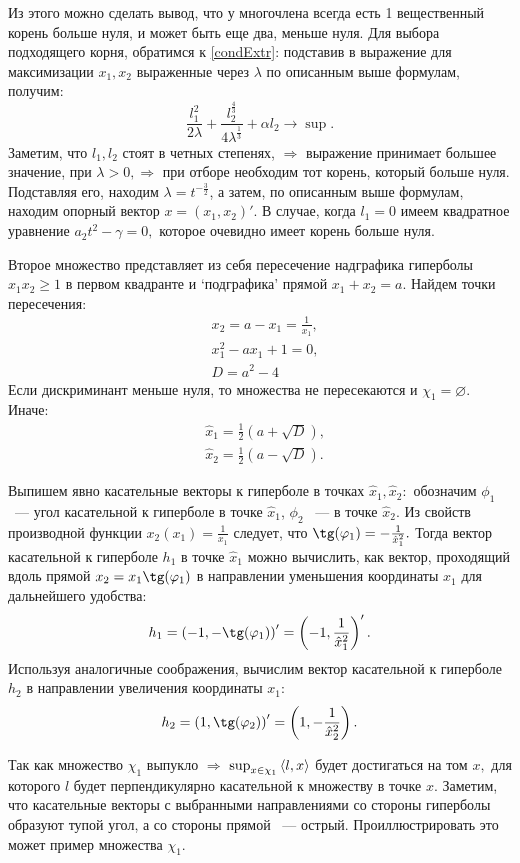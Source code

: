 \documentclass[11pt]{article}
\begin{document}
Из этого можно сделать вывод, что у многочлена всегда есть 1 вещественный корень больше нуля, и может быть еще два, меньше нуля.
Для выбора подходящего корня, обратимся к \eqref{condExtr}: подставив в выражение для максимизации $x_1, x_2$ выраженные через 
$\lambda$ по описанным выше формулам, получим:
\[
\frac{l_1^2}{2\lambda} + \frac{l_2^{\frac{4}{3}}}{4\lambda ^{\frac{1}{3}}} + \alpha l_2 \rightarrow \sup.
\]
Заметим, что $l_1, l_2$ стоят в четных степенях, $\Rightarrow$ выражение принимает большее значение, при $\lambda > 0, \Rightarrow$
при отборе необходим тот корень, который больше нуля.
Подставляя его, находим $\lambda = t^{-\frac{3}{2}}$, а затем, по описанным выше формулам, находим 
опорный вектор $x = (x_1,x_2)'.$
В случае, когда $l_1 = 0$ имеем квадратное уравнение $a_2 t^2  - \gamma = 0,$ которое очевидно имеет корень больше нуля.

Второе множество представляет из себя пересечение надграфика гиперболы $x_1x_2 \ge 1$ в первом квадранте 
и ‘подграфика’ прямой $x_1+x_2 = a$. Найдем точки пересечения:
\[
\begin{aligned}
&x_2 = a - x_1 = \frac{1}{x_1},
\\
&x_1^2 - ax_1 + 1 = 0,
\\
&D = a^2 - 4
\end{aligned}
\]
Если дискриминант меньше нуля, то множества не пересекаются и $\chi_1 = \varnothing$. Иначе:
\[
\begin{aligned}
&\hat x_1 = \frac{1}{2}\left(a + \sqrt{D} \right),
\\
&\hat x_2 = \frac{1}{2}\left(a - \sqrt{D} \right).
\end{aligned}
\]

Выпишем явно касательные векторы к гиперболе в точках $\hat x_1, \hat x_2:$
обозначим $\phi_1$ ~--- угол касательной к гиперболе в точке $\hat x_1$, $\phi_2$ ~--- в точке $\hat x_2.$
Из свойств производной функции $x_2(x_1) = \frac{1}{x_1}$ следует, что $\tg(\phi_1) = -\frac{1}{\hat x_1^2}.$
Тогда вектор касательной к гиперболе $h_1$ в точке $\hat x_1$ можно вычислить, как вектор, проходящий вдоль прямой $x_2 = x_1 \tg(\phi_1)$
в направлении уменьшения координаты $x_1$ для дальнейшего удобства:
\[
h_1 = \left(-1, -\tg(\phi_1) \right)' = \left(-1, \frac{1}{\hat x_1^2} \right)'.
\]
Используя аналогичные соображения, вычислим вектор касательной к гиперболе $h_2$
в направлении увеличения координаты $x_1$:
\[
h_2 = \left(1, \tg(\phi_2) \right)' = \left(1, -\frac{1}{\hat x_2^2} \right). 
\]

Так как множество $\chi_1$ выпукло $\Rightarrow$ $\sup_{x \in \chi_1} \left<l,x\right>$ будет достигаться
на том $x,$ для которого $l$ будет перпендикулярно касательной к множеству в точке $x.$
Заметим, что касательные векторы с выбранными направлениями со стороны гиперболы образуют тупой угол, а со стороны прямой ~--- острый.
Проиллюстрировать это может пример множества $\chi_1.$
\newpage
\end{document}
